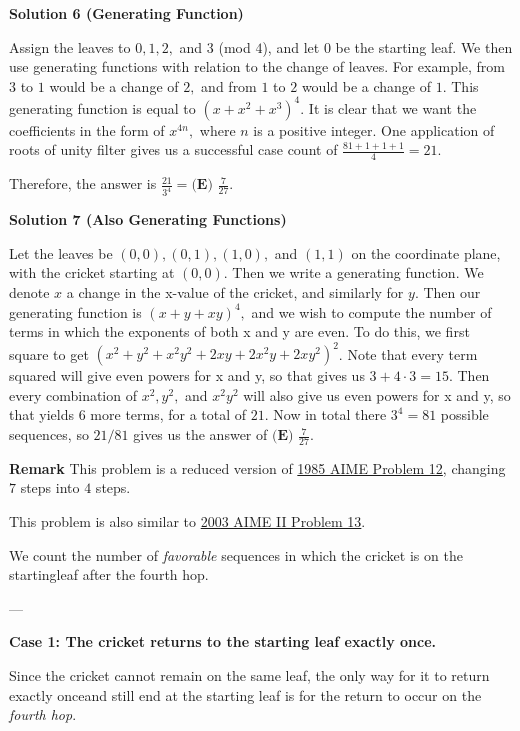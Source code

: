 \begin{enumerate}
\textbf{Solution 6 (Generating Function)}

Assign the leaves to $0, 1, 2,$ and $3$ (mod $4$), and let $0$ be the starting leaf. We then use generating functions with relation to the change of leaves. For example, from $3$ to $1$ would be a change of $2,$ and from $1$ to $2$ would be a change of $1.$ This generating function is equal to $(x+x^2+x^3)^4.$ It is clear that we want the coefficients in the form of $x^{4n},$ where $n$ is a positive integer. One application of roots of unity filter gives us a successful case count of $\frac{81+1+1+1}{4} = 21.$

 Therefore, the answer is $\frac{21}{3^4}=\boxed{\textbf{(E) }\frac{7}{27}}.$




\textbf{Solution 7 (Also Generating Functions)}

Let the leaves be $(0,0), (0,1), (1,0),$ and $(1,1)$ on the coordinate plane, with the cricket starting at $(0,0)$. Then we write a generating function. We denote $x$ a change in the x-value of the cricket, and similarly for $y$. Then our generating function is $(x+y+xy)^4,$ and we wish to compute the number of terms in which the exponents of both x and y are even. To do this, we first square to get $(x^2 + y^2 + x^2y^2 + 2xy + 2x^2y + 2xy^2)^2$. Note that every term squared will give even powers for x and y, so that gives us $3 + 4\cdot3 = 15.$ Then every combination of $x^2, y^2,$ and $x^2y^2$ will also give us even powers for x and y, so that yields $6$ more terms, for a total of $21.$ Now in total there $3^4 = 81$ possible sequences, so $21/81$ gives us the answer of $\boxed{\textbf{(E) }\frac{7}{27}}.$

 \textbf{Remark} This problem is a reduced version of \href{https://artofproblemsolving.com/wiki/index.php/1985\_AIME\_Problems/Problem\_12}{1985 AIME Problem 12}, changing $7$ steps into $4$ steps.

 This problem is also similar to \href{https://artofproblemsolving.com/wiki/index.php/2003\_AIME\_II\_Problems/Problem\_13}{2003 AIME II Problem 13}.

 We count the number of \emph{favorable} sequences in which the cricket is on the startingleaf after the fourth hop.

 ---

 \textbf{Case 1: The cricket returns to the starting leaf exactly once.}

 Since the cricket cannot remain on the same leaf, the only way for it to return exactly onceand still end at the starting leaf is for the return to occur on the \emph{fourth hop}.


\end{enumerate}
